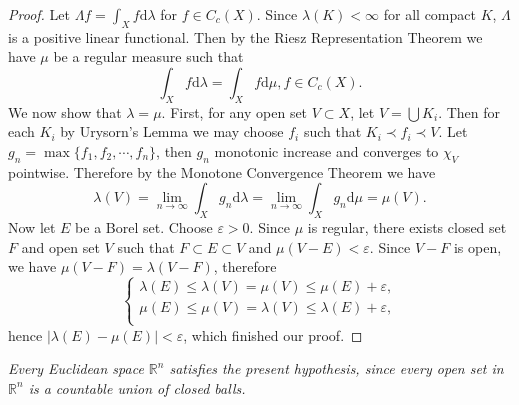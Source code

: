 \begin{proof}
Let $\Lambda f=\int_Xf\mathrm{d}\lambda$ for $f\in C_c(X)$. Since $\lambda(K)<\infty$ for all compact $K$, $\Lambda$ is a positive linear functional. Then by the Riesz Representation Theorem we have $\mu$ be a regular measure such that 
$$
\int_X{f\mathrm{d}\lambda}=\int_X{f\mathrm{d}\mu},f\in C_c\left( X \right) .
$$
We now show that $\lambda=\mu$. First, for any open set $V\subset X$, let $V=\bigcup K_i$. Then for each $K_i$ by Urysorn's Lemma we may choose $f_i$ such that $K_i\prec f_i\prec V$. Let $g_n=\max\{f_1,f_2,\cdots,f_n\}$, then $g_n$ monotonic increase and converges to $\chi_V$ pointwise. Therefore by the Monotone Convergence Theorem we have 
$$
\lambda \left( V \right) =\lim_{n\rightarrow \infty} \int_X{g_n\mathrm{d}\lambda}=\lim_{n\rightarrow \infty} \int_X{g_n\mathrm{d}\mu}=\mu \left( V \right) .
$$
Now let $E$ be a Borel set. Choose $\varepsilon>0$. Since $\mu$ is regular, there exists closed set $F$ and open set $V$ such that $F\subset E\subset V$ and $\mu(V-E)<\varepsilon$. Since $V-F$ is open, we have $\mu(V-F)=\lambda(V-F)$, therefore 
$$
\left\{ \begin{array}{c}
	\lambda \left( E \right) \le \lambda \left( V \right) =\mu \left( V \right) \le \mu \left( E \right) +\varepsilon ,\\
	\mu \left( E \right) \le \mu \left( V \right) =\lambda \left( V \right) \le \lambda \left( E \right) +\varepsilon ,\\
\end{array} \right. 
$$
hence $|\lambda(E)-\mu(E)|<\varepsilon$, which finished our proof.
\end{proof}
\begin{note}\em
Every Euclidean space $\mathbb{R}^n$ satisfies the present hypothesis, since every open set in $\mathbb{R}^n$ is a countable union of closed balls.
\end{note}
